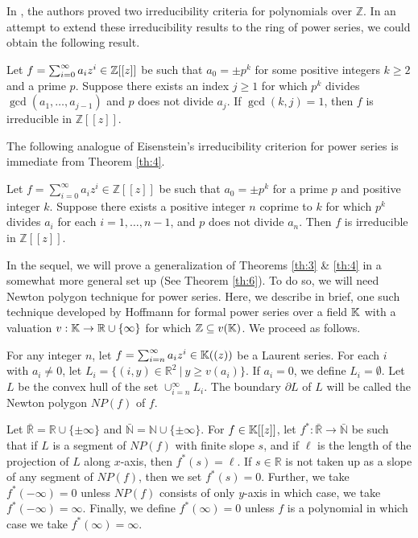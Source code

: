 \documentclass[12pt,reqno]{amsart}%
\begin{document}
In  \cite{J-S-3}, the authors proved two irreducibility criteria for polynomials over $\mathbb{Z}$. In an attempt to extend  these irreducibility results to the ring of power series, we could obtain the following result.
\begin{theorem}\label{th:4}
    Let $f = \sum_{i=0}^\infty a_i z^i\in \Bbb{Z}[[z]]$ be such that $a_0=\pm p^k$ for some  positive integers $k\geq 2$ and a prime $p$. Suppose there exists an index $j\geq 1$ for which $p^k$ divides $\gcd(a_1,\ldots,a_{j-1})$ and $p$ does not divide $a_j$. If $\gcd(k,j)=1$, then $f$ is  irreducible in $\mathbb{Z}[[z]]$.
\end{theorem}
The following analogue of Eisenstein's irreducibility criterion for power series is immediate from  Theorem \ref{th:4}.
\begin{corollary}\label{c:2}
Let $f=\sum_{i=0}^\infty a_iz^i\in \mathbb{Z}[[z]]$ be such that $a_0=\pm p^k$ for a prime $p$ and positive integer $k$. Suppose there exists a positive integer $n$ coprime to $k$ for which $p^k$ divides $a_i$ for each $i=1,\ldots, {n-1}$, and $p$ does not divide $a_n$. Then $f$ is irreducible in $\mathbb{Z}[[z]]$.
\end{corollary}
In  the sequel, we will prove a generalization of Theorems \ref{th:3} \& \ref{th:4} in a somewhat more general set up (See Theorem \ref{th:6}). To do so, we will need Newton polygon technique for power series. Here, we describe in brief, one such technique developed by Hoffmann \cite{Hoffman1994} for formal power series over a field $\mathbb{K}$ with a valuation $v:\mathbb{K}\rightarrow \mathbb{R}\cup \{\infty\}$ for which $\mathbb{Z}\subseteq v(\mathbb{K})$. We proceed as follows.
\begin{definition}
For any integer $n$, let $f=\sum_{i=n}^\infty a_i z^i \in \mathbb{K}((z))$ be a Laurent series. For each $i$ with $a_i\neq 0$, let
$L_i=\{(i,y)\in \mathbb{R}^2~|~y\geq v(a_i)\}$.
If $a_i=0$, we define $L_i=\emptyset$. Let $L$ be the convex hull of the set $\cup_{i=n}^\infty L_i$. The boundary $\partial L$ of $L$ will be called the Newton polygon $NP(f)$ of $f$.
\end{definition}
\begin{definition} Let $\bar{\mathbb{R}}=\mathbb{R}\cup \{\pm \infty\}$ and $\bar{\mathbb{N}}=\mathbb{N}\cup \{\pm \infty\}$. For  $f\in \mathbb{K}[[z]]$,  let $f^*:\bar{\mathbb{R}}\rightarrow \bar{\mathbb{N}}$ be such that if $L$ is a segment of $NP(f)$ with finite slope $s$, and if $\ell$ is the length of the projection of $L$ along $x$-axis, then $f^*(s)=\ell$. If $s\in \mathbb{R}$  is not taken up as a slope of any segment of $NP(f)$, then we set $f^*(s)=0$. Further, we take $f^*(-\infty)=0$ unless $NP(f)$ consists of only $y$-axis in which case, we take $f^*(-\infty)=\infty$. Finally, we define $f^*(\infty)=0$ unless $f$ is a polynomial in which case we take $f^*(\infty)=\infty$.
\end{definition}
\end{document}
